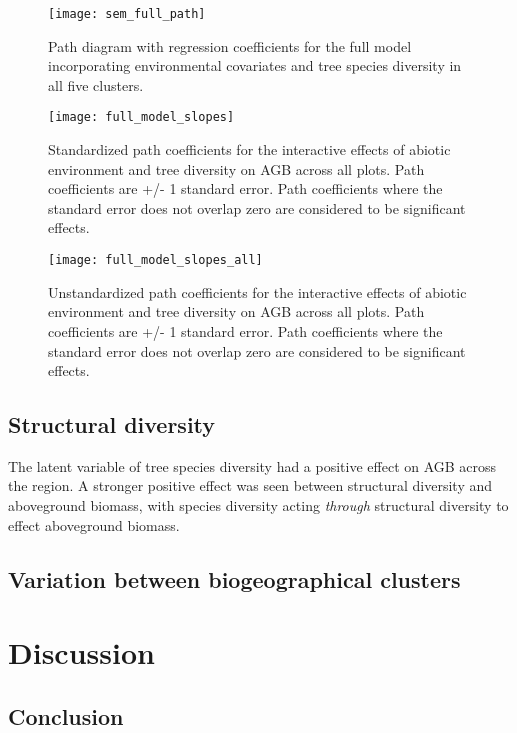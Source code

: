 \documentclass[11pt,a4paper]{article}
\begin{document}



\begin{figure}[H]
\centering
	\texttt{[image: sem\_full\_path]}
	\caption{Path diagram with regression coefficients for the full model incorporating environmental covariates and tree species diversity in all five clusters.}
	\label{sem_full_path}
\end{figure}


\begin{figure}[H]
\centering
	\texttt{[image: full\_model\_slopes]}
	\caption{Standardized path coefficients for the interactive effects of abiotic environment and tree diversity on AGB across all plots. Path coefficients are +/- 1 standard error. Path coefficients where the standard error does not overlap zero are considered to be significant effects.}
	\label{full_model_slopes}
\end{figure}

\begin{figure}[H]
\centering
	\texttt{[image: full\_model\_slopes\_all]}
	\caption{Unstandardized path coefficients for the interactive effects of abiotic environment and tree diversity on AGB across all plots. Path coefficients are +/- 1 standard error. Path coefficients where the standard error does not overlap zero are considered to be significant effects.}
	\label{full_model_slopes_all}
\end{figure}



\subsection{Structural diversity}

The latent variable of tree species diversity had a positive effect on AGB across the region. A stronger positive effect was seen between structural diversity and aboveground biomass, with species diversity acting \textit{through} structural diversity to effect aboveground biomass.

\subsection{Variation between biogeographical clusters}


\section{Discussion}

%

\subsection{Conclusion}
\end{document}

